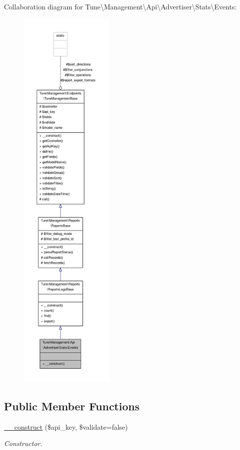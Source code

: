 Collaboration diagram for Tune\textbackslash{}Management\textbackslash{}Api\textbackslash{}Advertiser\textbackslash{}Stats\textbackslash{}Events\-:
\nopagebreak
\begin{figure}[H]
\begin{center}
\leavevmode
\includegraphics[height=550pt]{classTune_1_1Management_1_1Api_1_1Advertiser_1_1Stats_1_1Events__coll__graph}
\end{center}
\end{figure}
\subsection*{Public Member Functions}
\begin{DoxyCompactItemize}
\item 
\hyperlink{classTune_1_1Management_1_1Api_1_1Advertiser_1_1Stats_1_1Events_ab4c9eb1f6b98f929174ba24ef68f0829}{\-\_\-\-\_\-construct} (\$api\-\_\-key, \$validate=false)
\begin{DoxyCompactList}\small\item\em Constructor. \end{DoxyCompactList}\end{DoxyCompactItemize}
